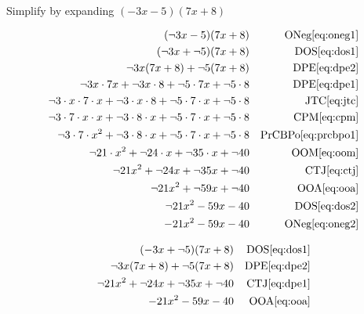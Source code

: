 \documentclass[20150903-160354-rs2.2-MarksMathNotebook.tex]{subfiles}
\begin{document}
\begin{example}[id:20141109-141019] \label{20141109-141019}  \hfill \\

Simplify by expanding $(-3x-5)(7x+8)$

\soln

\solnsteps
\begin{align*}
(\neg 3x - 5)(7x+8)  && \text{ONeg} \eqref{eq:oneg1} \\
(\neg 3x + \neg 5)(7x+8)  && \text{DOS} \eqref{eq:dos1} \\
\neg 3x(7x+8) + \neg 5(7x+8) && \text{DPE} \eqref{eq:dpe2} \\
\neg 3x \cdot 7x + \neg 3x \cdot 8 + \neg 5 \cdot 7x + \neg 5 \cdot 8 && \text{DPE} \eqref{eq:dpe1} \\
\neg 3 \cdot x \cdot 7 \cdot x + \neg 3 \cdot x \cdot 8 + \neg 5 \cdot 7 \cdot x + \neg 5 \cdot 8 && \text{JTC} \eqref{eq:jtc} \\
\neg 3 \cdot 7 \cdot x \cdot x + \neg 3 \cdot 8 \cdot x + \neg 5 \cdot 7 \cdot x + \neg 5 \cdot 8  && \text{CPM} \eqref{eq:cpm} \\
\neg 3 \cdot 7 \cdot x^2 + \neg 3 \cdot 8 \cdot x + \neg 5 \cdot 7 \cdot x + \neg 5 \cdot 8  && \text{PrCBPo} \eqref{eq:prcbpo1} \\
\neg 21 \cdot x^2 + \neg 24 \cdot x + \neg 35 \cdot x + \neg 40  && \text{OOM} \eqref{eq:oom} \\
\neg 21  x^2 + \neg 24  x + \neg 35  x + \neg 40  && \text{CTJ} \eqref{eq:ctj} \\
\neg 21 x^2 + \neg 59 x + \neg 40  && \text{OOA} \eqref{eq:ooa} \\
\neg 21 x^2 - 59 x - 40  && \text{DOS} \eqref{eq:dos2} \\
- 21 x^2 - 59 x - 40  && \text{ONeg} \eqref{eq:oneg2}
\end{align*}

\soln

\lesssteps
\begin{align*}
(-3x+\neg 5)(7x+8) && \text{DOS} \eqref{eq:dos1} \\
\neg 3x(7x+8) + \neg 5(7x+8) && \text{DPE} \eqref{eq:dpe2} \\
\neg 21  x^2 + \neg 24  x + \neg 35  x + \neg 40  && \text{CTJ} \eqref{eq:dpe1} \\
-21x^2-59x-40 && \text{OOA} \eqref{eq:ooa}
\end{align*}
\end{example}
\end{document}
